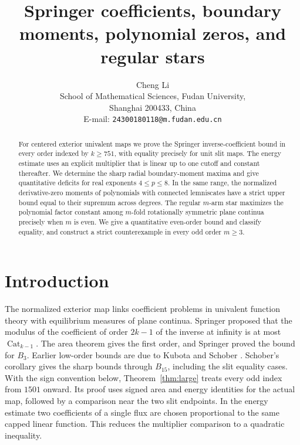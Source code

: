 \documentclass[11pt]{article}
\title{Springer coefficients, boundary moments, polynomial zeros, and regular stars}
\author{Cheng Li\\
	\footnotesize School of Mathematical Sciences, Fudan University,\\
	\footnotesize Shanghai 200433, China\\
	\footnotesize E-mail: \texttt{24300180118@m.fudan.edu.cn}}
\date{}
\newcommand{\Cat}{\operatorname{Cat}}
\begin{document}
	\maketitle
	\begin{abstract}
		For centered exterior univalent maps we prove the Springer
		inverse-coefficient bound in every order indexed by \(k\geq751\),
		with equality precisely for unit slit maps. The energy estimate
		uses an explicit multiplier that is linear up to one cutoff and
		constant thereafter. We determine the sharp radial boundary-moment
		maxima and give quantitative deficits for real exponents
		\mbox{\(4\leq p\leq8\)}. In the same range, the normalized derivative-zero
		moments of polynomials with connected lemniscates have a strict
		upper bound equal to their supremum across degrees. The regular
		\(m\)-arm star maximizes the polynomial factor constant among
		\(m\)-fold rotationally symmetric plane continua precisely when \(m\)
		is even. We give a quantitative even-order bound and classify
		equality, and construct a strict counterexample in every odd
		order \(m\geq3\).
	\end{abstract}
	
	\section{Introduction}
	The normalized exterior map links coefficient problems in univalent
	function theory with equilibrium measures of plane continua.
	Springer \cite{Springer} proposed that the modulus of the coefficient
	of order $2k-1$ of the inverse at infinity is at most $\Cat_{k-1}$.
	The area theorem gives the first order, and Springer proved the bound for $B_3$.
	Earlier low-order bounds are due to Kubota and Schober
	\cite{Kubota,Schober77}. Schober's corollary
	\cite[p.~413]{Schober} gives the sharp bounds through $B_{15}$,
	including the slit equality cases. With the sign convention below, Theorem~\ref{thm:large} treats
	every odd index from $1501$ onward. Its proof uses signed area and energy
	identities for the actual map, followed by a comparison near the two
	slit endpoints. In the energy estimate two coefficients of a single
	flux are chosen proportional to the same capped linear function.
	This reduces the multiplier comparison to a quadratic inequality.
	
\end{document}
